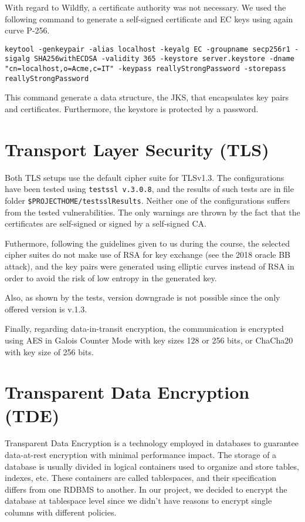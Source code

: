 With regard to Wildfly, a certificate authority was not necessary. We used the following command to generate a self-signed certificate and EC keys using again curve P-256.

\begin{center}
    \texttt{keytool -genkeypair -alias localhost -keyalg EC -groupname secp256r1 -sigalg SHA256withECDSA -validity 365 -keystore server.keystore -dname "cn=localhost,o=Acme,c=IT" -keypass reallyStrongPassword -storepass reallyStrongPassword}
\end{center}

This command generate a data structure, the JKS, that encapsulates key pairs and certificates. Furthermore, the keystore is protected by a password.

\section{Transport Layer Security (TLS)}

Both TLS setups use the default cipher suite for TLSv1.3. The configurations have been tested using \texttt{testssl v.3.0.8}, and the results of such tests are in file folder \texttt{\${PROJECT\textunderscore HOME}/testsslResults}. Neither one of the configurations suffers from the tested vulnerabilities. The only warnings are thrown by the fact that the certificates are self-signed or signed by a self-signed CA.

Futhermore, following the guidelines given to us during the course, the selected cipher suites do not make use of RSA for key exchange (see the 2018 oracle BB attack), and the key pairs were generated using elliptic curves instead of RSA in order to avoid the risk of low entropy in the generated key.

Also, as shown by the tests, version downgrade is not possible since the only offered version is v.1.3. 

Finally, regarding data-in-transit encryption, the communication is encrypted using AES in Galois Counter Mode with key sizes 128 or 256 bits, or ChaCha20 with key size of 256 bits.

\section{Transparent Data Encryption (TDE)}

Transparent Data Encryption is a technology employed in databases to guarantee data-at-rest encryption with minimal performance impact. The storage of a database is usually divided in logical containers used to organize and store tables, indexes, etc. These containers are called tablespaces, and their specification differs from one RDBMS to another. In our project, we decided to encrypt the database at tablespace level since we didn't have reasons to encrypt single columns with different policies.

